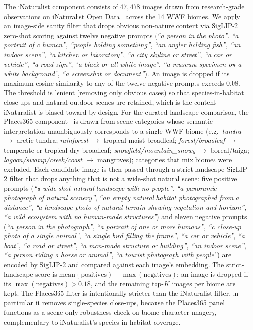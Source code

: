 \documentclass[11pt,a4paper]{article}
\begin{document}
The iNaturalist component consists of $47{,}478$ images drawn from
research-grade observations on iNaturalist Open
Data~\citep{inaturalist2024} across the 14 WWF biomes. We apply an
image-side sanity filter that drops obvious non-nature content via
SigLIP-2 zero-shot scoring against twelve negative prompts
(\emph{``a person in the photo''}, \emph{``a portrait of a human''},
\emph{``people holding something''}, \emph{``an angler holding
fish''}, \emph{``an indoor scene''}, \emph{``a kitchen or
laboratory''}, \emph{``a city skyline or street''}, \emph{``a car
or vehicle''}, \emph{``a road sign''}, \emph{``a black or
all-white image''}, \emph{``a museum specimen on a white
background''}, \emph{``a screenshot or document''}). An image is
dropped if its maximum cosine similarity to any of the twelve
negative prompts exceeds $0.08$. The threshold is lenient
(removing only obvious cases) so that species-in-habitat
close-ups and natural outdoor scenes are retained, which is the
content iNaturalist is biased toward by design. For the curated landscape comparison, the Places365
component~\citep{zhou2018places} is drawn from scene categories
whose semantic interpretation unambiguously corresponds to a
single WWF biome (e.g.\ \emph{tundra} $\to$ arctic tundra;
\emph{rainforest} $\to$ tropical moist broadleaf;
\emph{forest/broadleaf} $\to$ temperate or tropical dry
broadleaf; \emph{snowfield/mountain\_snowy} $\to$ boreal/taiga;
\emph{lagoon/swamp/creek/coast} $\to$ mangroves); categories that
mix biomes were excluded. Each candidate image is then passed
through a strict-landscape SigLIP-2 filter that drops anything
that is not a wide-shot natural scene: five positive prompts
(\emph{``a wide-shot natural landscape with no people''},
\emph{``a panoramic photograph of natural scenery''}, \emph{``an
empty natural habitat photographed from a distance''}, \emph{``a
landscape photo of natural terrain showing vegetation and
horizon''}, \emph{``a wild ecosystem with no human-made
structures''}) and eleven negative prompts (\emph{``a person in
the photograph''}, \emph{``a portrait of one or more humans''},
\emph{``a close-up photo of a single animal''}, \emph{``a single
bird filling the frame''}, \emph{``a car or vehicle''}, \emph{``a
boat''}, \emph{``a road or street''}, \emph{``a man-made structure
or building''}, \emph{``an indoor scene''}, \emph{``a person
riding a horse or animal''}, \emph{``a tourist photograph with
people''}) are encoded by SigLIP-2 and compared against each
image's embedding. The strict-landscape score is
$\mathrm{mean}(\text{positives}) - \max(\text{negatives})$; an
image is dropped if its $\max(\text{negatives}) > 0.18$, and the
remaining top-$K$ images per biome are kept. The Places365 filter
is intentionally stricter than the iNaturalist filter, in
particular it removes single-species close-ups, because the
Places365 panel functions as a scene-only robustness check on
biome-character imagery, complementary to iNaturalist's
species-in-habitat coverage.
\end{document}
